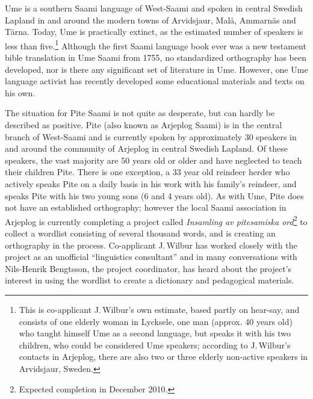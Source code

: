 \documentclass[a4paper,12pt]{article}
\begin{document}
Ume is a southern Saami language of West-Saami and spoken in central Swedish Lapland in and around the modern towns of Arvidsjaur, Malå, Ammarnäs and Tärna. Today, Ume is practically extinct, as the estimated number of speakers is less than five.\footnote{This is co-applicant J.\,Wilbur's own estimate, based partly on hear-say, and consists of one elderly woman in Lycksele, one man (approx. 40 years old) who taught himself Ume as a second language, but speaks it with his two children, who could be considered Ume speakers; according to J.\,Wilbur's contacts in Arjeplog, there are also two or three elderly non-active speakers in Arvidsjaur, Sweden.} Although the first Saami language book ever was a new testament bible translation in Ume Saami from 1755, no standardized orthography has been developed, nor is there any significant set of literature in Ume. However, one Ume language activist has recently developed some educational materials and texts on his own.

The situation for Pite Saami is not quite as desperate, but can hardly be described as positive. Pite (also known as Arjeplog Saami) is in the central branch of West-Saami and is currently spoken by approximately 30 speakers in and around the community of Arjeplog in central Swedish Lapland. Of these speakers, the vast majority are 50 years old or older and have neglected to teach their children Pite. There is one exception, a 33 year old reindeer herder who actively speaks Pite on a daily basis in his work with his family's reindeer, and speaks Pite with his two young sons (6 and 4 years old). As with Ume, Pite does not have an established orthography; however the local Saami association in Arjeplog is currently completing a project called \textit{Insamling av pitesamiska ord}\footnote{Expected completion in December 2010.} to collect a wordlist consisting of several thousand words, and is creating an orthography in the process. Co-applicant J.\,Wilbur has worked closely with the project as an unofficial “linguistics consultant” and in many conversations with Nils-Henrik Bengtsson, the project coordinator, has heard about the project's interest in using the wordlist to create a dictionary and pedagogical materials.
\end{document}
